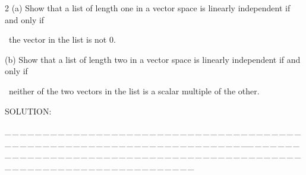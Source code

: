 \documentclass[a4paper, 11pt, UTF8]{article}
\begin{document}
\begin{large}
{\timesbf\Large 2} (a) {\timessl\Large
Show that a list of length one in a vector space is linearly independent if and only if}\par\quad\quad\,
{\timessl\Large the vector in the list is not 0.}\par\quad
(b) {\timessl\Large Show that a list of length two in a vector space is linearly independent if and only if}\par\quad\quad\,
{\timessl\Large neither of the two vectors in the list is a scalar multiple of the other.
}\par
{\timesbf S\footnotesize{OLUTION:}}\par{}\par{}\par
{\tiny \_\,\_\,\_\,\_\,\_\,\_\,\_\,\_\,\_\,\_\,\_\,\_\,\_\,\_\,\_\,\_\,\_\,\_\,\_\,\_\,\_\,\_\,\_\,\_\,\_\,\_\,\_\,\_\,\_\,\_\,\_\,\_\,\_\,\_\,\_\,\_\,\_\,\_\,\_\,\_\,\_\,\_\,\_\,\_\,\_\,\_\,\_\,\_\,\_\,\_\,\_\,\_\,\_\,\_\,\_\,\_\,\_\,\_\,\_\,\_\,\_\,\_\,\_\,\_\,\_\,\_\,\_\,\_\,\_\,\_\,\_\_\,\_\,\_\,\_\,\_\,\_\,\_\,\_\,\_\,\_\,\_\,\_\,\_\,\_\,\_\,\_\,\_\,\_\,\_\,\_\,\_\,\_\,\_\,\_\,\_\,\_\,\_\,\_\,\_\,\_\,\_\,\_\,\_\,\_\,\_\,\_\,\_\,\_\,\_\,\_\,\_\,\_\,\_\,\_\,\_\,\_\,\_\,\_\,\_\,\_\,\_\,\_\,\_\,\_\,\_\,\_\,\_\,\_\,\_\,\_\,\_\,\_\,\_\,\_\,\_\,\_\,\_\,\_\,\_\,\_\,\_}\par


\end{large}
\end{document}
